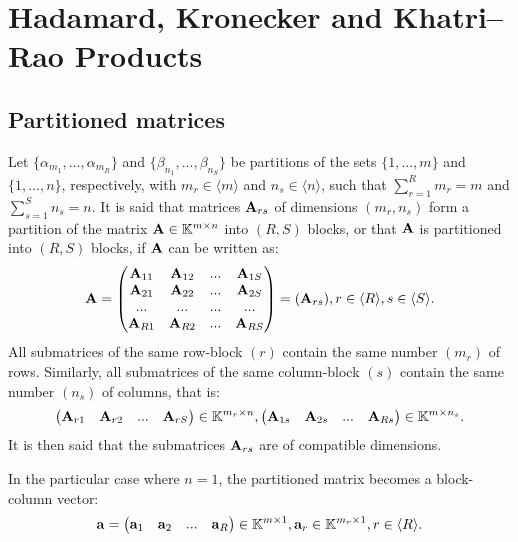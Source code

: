 \chapter{Hadamard, Kronecker and Khatri–Rao Products}

\section{Partitioned matrices}

Let $\{\alpha_{m_1},...,\alpha_{m_R}\}$
and $\{\beta_{n_1},...,\beta_{n_S}\}$
be partitions of the sets $\{1,...,m\}$
and $\{1,...,n\}$, respectively, with 
$m_r\in \langle m \rangle$ and $n_s\in\langle n\rangle$,
such that $\sum\limits_{r=1}^{R}m_r=m$ and $\sum\limits_{s=1}^{S}n_s=n$.
It is said that matrices $\bold{A}_{rs}$ of dimensions $(m_r,n_s)$
form a partition of the matrix $\bold{A}\in \mathbb{K}^{m\times n}$ into $(R,S)$ blocks,
or that $\bold{A}$ is partitioned into $(R,S)$ blocks, if $\bold{A}$ can be written as:
\begin{align*}
    \bold{A}=\begin{pmatrix}
        \bold{A}_{11}&\bold{A}_{12}&...&\bold{A}_{1S}\\
        \bold{A}_{21}&\bold{A}_{22}&...&\bold{A}_{2S}\\
        ...&...&...&...\\
        \bold{A}_{R1}&\bold{A}_{R2}&...&\bold{A}_{RS}\\
    \end{pmatrix}=(\bold{A}_{rs}), r\in\langle R\rangle, s\in\langle S\rangle.
\end{align*}
All submatrices of the same row-block $(r)$ contain the same number $(m_r)$ of rows.
Similarly, all submatrices of the same column-block $(s)$ contain the same number $(n_s)$ of columns,
that is:
\begin{align*}
    \begin{pmatrix}
        \bold{A}_{r1}&\bold{A}_{r2}&...&\bold{A}_{rS}
    \end{pmatrix}\in \mathbb{K}^{m_r\times n},
    \begin{pmatrix}
        \bold{A}_{1s}&\bold{A}_{2s}&...&\bold{A}_{Rs}
    \end{pmatrix}\in \mathbb{K}^{m\times n_s}.
\end{align*}
It is then said that the submatrices $\bold{A}_{rs}$ are of compatible dimensions.
\par
In the particular case where $n=1$,
the partitioned matrix becomes a block-column vector:
\begin{align*}
    \bold{a}=\begin{pmatrix}
        \bold{a}_1&\bold{a}_2&...&\bold{a}_{R}
    \end{pmatrix}\in \mathbb{K}^{m\times 1},
    \bold{a}_r\in \mathbb{K}^{m_r\times 1},r\in \langle R\rangle.
\end{align*}
